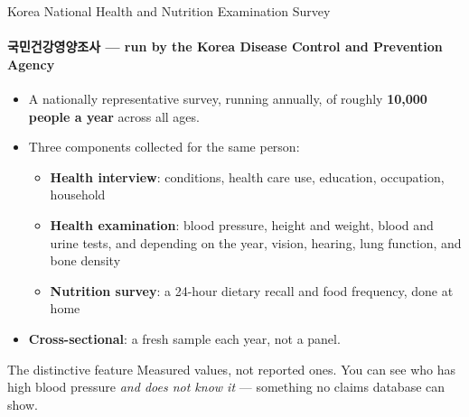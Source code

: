 \documentclass[aspectratio=169,11pt]{beamer}
\newcommand{\hl}[1]{\textbf{\color{kdgreen}#1}}
\begin{document}
\begin{frame}{Korea National Health and Nutrition Examination Survey}
  \framesubtitle{국민건강영양조사 --- run by the Korea Disease Control and Prevention Agency}
  \begin{itemize}
    \setlength{\itemsep}{8pt}
    \item A nationally representative survey, running annually, of roughly
          \hl{10,000 people a year} across all ages.
    \item Three components collected for the same person:
      \begin{itemize}
        \item \hl{Health interview}: conditions, health care use, education, occupation, household
        \item \hl{Health examination}: blood pressure, height and weight, blood and urine
              tests, and depending on the year, vision, hearing, lung function, and bone density
        \item \hl{Nutrition survey}: a 24-hour dietary recall and food frequency, done at home
      \end{itemize}
    \item \hl{Cross-sectional}: a fresh sample each year, not a panel.
  \end{itemize}
  \vspace{4pt}
  \begin{block}{The distinctive feature}
    Measured values, not reported ones. You can see who has high blood pressure
    \emph{and does not know it} --- something no claims database can show.
  \end{block}
\end{frame}
\end{document}
